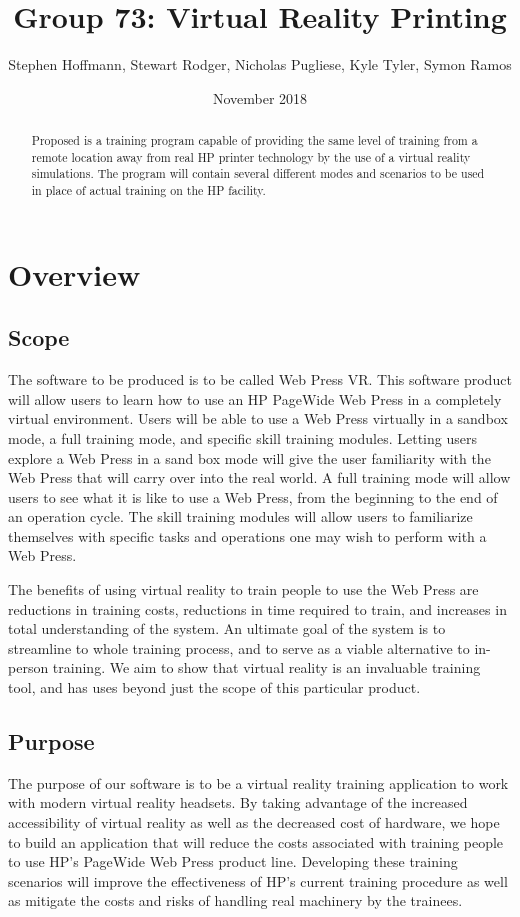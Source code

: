 \documentclass[onecolumn, draftclsnofoot,10pt, compsoc]{IEEEtran}
\title{Group 73: Virtual Reality Printing}
\author{Stephen Hoffmann, Stewart Rodger, Nicholas Pugliese, Kyle Tyler, Symon Ramos}
\date{November 2018}
\begin{document}
\maketitle
    \begin{abstract}
        Proposed is a training program capable of providing the same level of training from a remote location away from real HP printer technology by the use of a virtual reality simulations. The program will contain several different modes and scenarios to be used in place of actual training on the HP facility.
    \end{abstract}
\newpage
{}
\tableofcontents
\clearpage


\section{Overview}
\subsection{Scope}
The software to be produced is to be called Web Press VR. This software product will allow users to learn how to use an HP PageWide Web Press in a completely virtual environment. Users will be able to use a Web Press virtually in a sandbox mode, a full training mode, and specific skill training modules. Letting users explore a Web Press in a sand box mode will give the user familiarity with the Web Press that will carry over into the real world. A full training mode will allow users to see what it is like to use a Web Press, from the beginning to the end of an operation cycle. The skill training modules will allow users to familiarize themselves with specific tasks and operations one may wish to perform with a Web Press.

The benefits of using virtual reality to train people to use the Web Press are reductions in training costs, reductions in time required to train, and increases in total understanding of the system. An ultimate goal of the system is to streamline to whole training process, and to serve as a viable alternative to in-person training. We aim to show that virtual reality is an invaluable training tool, and has uses beyond just the scope of this particular product. 
\subsection{Purpose}
The purpose of our software is to be a virtual reality training application to work with modern virtual reality headsets. By taking advantage of the increased accessibility of virtual reality as well as the decreased cost of hardware, we hope to build an application that will reduce the costs associated with training people to use HP's PageWide Web Press product line. Developing these training scenarios will improve the effectiveness of HP's current training procedure as well as mitigate the costs and risks of handling real machinery by the trainees.
\end{document}
